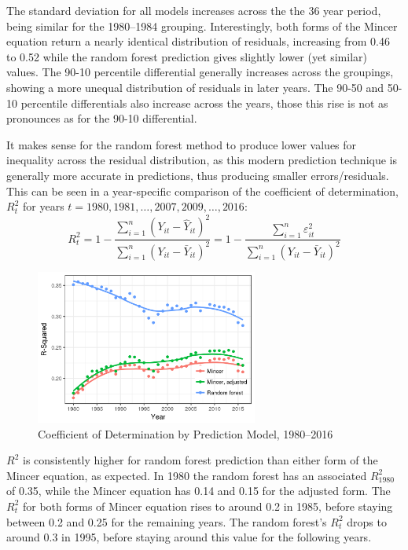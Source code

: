 \documentclass[notitlepage,12pt]{article}
\begin{document}
The standard deviation for all models increases across the the 36 year period, being similar for the 1980--1984 grouping.  Interestingly, both forms of the Mincer equation return a nearly identical distribution of residuals, increasing from 0.46 to 0.52 while the random forest prediction gives slightly lower (yet similar) values.  The 90-10 percentile differential generally increases across the groupings, showing a more unequal distribution  of residuals in later years.  The 90-50 and 50-10 percentile differentials also increase across the years, those this rise is not as pronounces as for the 90-10 differential.  

It makes sense for the random forest method to produce lower values for inequality across the residual distribution, as this modern prediction technique is generally more accurate in predictions, thus producing smaller errors/residuals.  This can be seen in a year-specific comparison of the coefficient of determination, $R_t^2$ for years $t=1980, 1981, \dots , 2007, 2009, \dots , 2016$:
\begin{equation}
R^2_t = 1 - \frac{\sum_{i=1}^n(Y_{it} -  \hat{Y}_{it})^2}{\sum_{i=1}^n (Y_{it} - \bar{Y}_{it})^2} = 1 - \frac{\sum_{i=1}^n\varepsilon_{it}^2}{\sum_{i=1}^n (Y_{it} - \bar{Y}_{it})^2}
\end{equation}

\begin{figure}[h]
  \caption{Coefficient of Determination by Prediction Model, 1980--2016}
  \centering
  \includegraphics[width=0.65\textwidth]{rsquared.png}
\end{figure}
\noindent
$R^2$ is consistently higher for random forest prediction than either form of the Mincer equation, as expected.  In 1980 the random forest has an associated $R_{1980}^2$ of 0.35, while the Mincer equation has 0.14 and 0.15 for the adjusted form.  The $R_t^2$ for both forms of Mincer equation rises to around 0.2 in 1985, before staying between 0.2 and 0.25 for the remaining years.  The random forest's $R^2_t$ drops to around 0.3 in 1995, before staying around this value for the following years.
\end{document}
